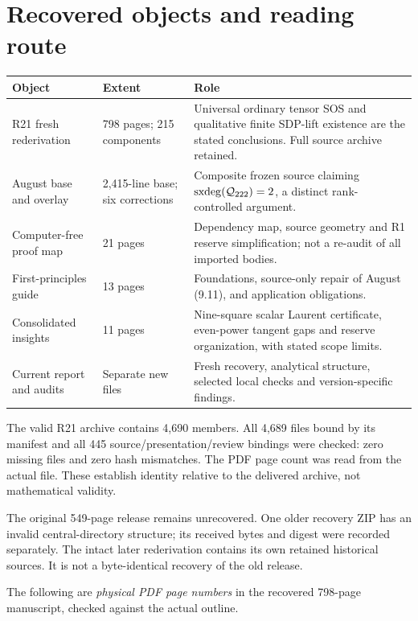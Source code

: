 \tableofcontents
\newpage
\section{Recovered objects and reading route}

\begin{longtable}{@{}L{0.25\textwidth}L{0.19\textwidth}L{0.48\textwidth}@{}}
\toprule Object & Extent & Role\\ \midrule\endhead
R21 fresh rederivation & 798 pages; 215 components &
Universal ordinary tensor SOS and qualitative finite SDP-lift existence
are the stated conclusions. Full source archive retained.\\
August base and overlay & 2,415-line base; six corrections &
Composite frozen source claiming \(\operatorname{sxdeg}(\mathcal Q_{222})=2\), a distinct
rank-controlled argument.\\
Computer-free proof map & 21 pages &
Dependency map, source geometry and R1 reserve simplification;
not a re-audit of all imported bodies.\\
First-principles guide & 13 pages &
Foundations, source-only repair of August (9.11), and application
obligations.\\
Consolidated insights & 11 pages &
Nine-square scalar Laurent certificate, even-power tangent gaps
and reserve organization, with stated scope limits.\\
Current report and audits & Separate new files &
Fresh recovery, analytical structure, selected local checks and
version-specific findings.\\ \bottomrule
\end{longtable}

The valid R21 archive contains 4,690 members. All 4,689 files bound by its
manifest and all 445 source/presentation/review bindings were checked:
zero missing files and zero hash mismatches. The PDF page count was read
from the actual file. These establish identity relative to the delivered
archive, not mathematical validity.

The original 549-page release remains unrecovered. One older recovery ZIP
has an invalid central-directory structure; its received bytes and digest
were recorded separately. The intact later rederivation contains its own
retained historical sources. It is not a byte-identical recovery of the old
release.

The following are \emph{physical PDF page numbers} in the recovered
798-page manuscript, checked against the actual outline.


